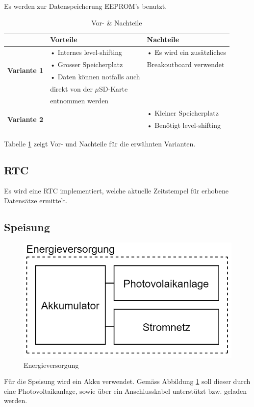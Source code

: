 Es werden zur Datenspeicherung EEPROM's benutzt.\\

\begin{table}[h]
  \centering
  \label{tab:datenspeicherung}
  \small
  \caption{Vor- \& Nachteile}
    \begin{tabular}{c|l|l}
          & \textbf{Vorteile} & \textbf{Nachteile} \\
    \toprule
    \multirow{4}[2]{*}{\textbf{Variante 1}} & • Internes level-shifting & • Es wird ein zusätzliches \\
          & • Grosser Speicherplatz & \hspace{0.3cm}Breakoutboard verwendet \\
          & • Daten können notfalls auch &  \\
          &   \hspace{0.3cm} direkt von der $\mu$SD-Karte &  \\
          &   \hspace{0.3cm} entnommen werden &  \\
    \hline
    \multirow{2}[1]{*}{\textbf{Variante 2}} &       & • Kleiner Speicherplatz \\
          &       & • Benötigt level-shifting \\
    \end{tabular}%
  \label{tab:Datenspeicherung}%
\end{table}%

Tabelle \ref{tab:Datenspeicherung} zeigt Vor- und Nachteile für die erwähnten Varianten.\\

\subsection{RTC}
Es wird eine RTC implementiert, welche aktuelle Zeitstempel für erhobene Datensätze ermittelt.\\

\subsection{Speisung}
\begin{figure}[h]
\centering
\includegraphics[scale=0.6]{graphics/Energieversorgung.PNG}
\caption{Energieversorgung}
\label{fig:Energieversorgung}
\end{figure}

Für die Speisung wird ein Akku verwendet. Gemäss Abbildung \ref{fig:Energieversorgung} soll dieser durch eine Photovoltaikanlage, sowie über ein Anschlusskabel unterstützt bzw. geladen werden.\\
